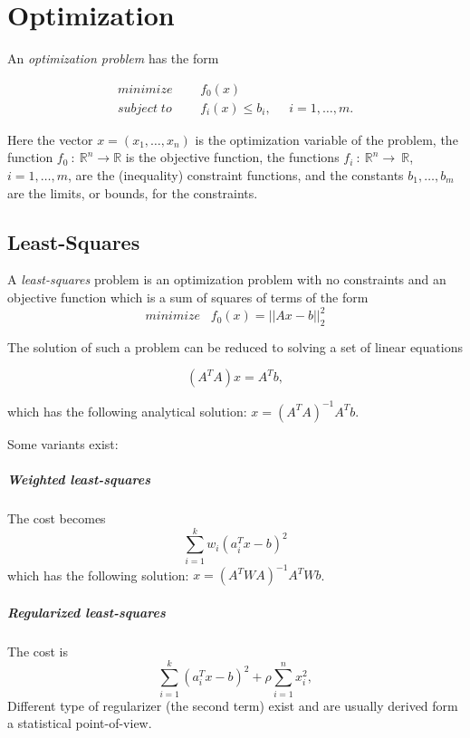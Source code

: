 
\chapter{Optimization}

An \textit{optimization problem} has the form

\begin{equation}
    \begin{split}
        minimize &\;\;\;\;\; f_0(x) \\
        subject\;to &\;\;\;\;\; f_i(x) \leq b_i,\;\;\;\;\; i=1, \dots, m.
    \end{split}
\end{equation}


Here the vector $x=(x_1, \dots, x_n)$ is the optimization variable of the problem, the function $f_0~:~\mathbb{R}^n\rightarrow \mathbb{R}$ is the objective function, the functions $f_i~ :~\mathbb{R}^n\rightarrow~\mathbb{R}$, $i=1, \dots, m$, are the (inequality) constraint functions, and the constants $b_1, \dots, b_m$ are the limits, or bounds, for the constraints.

\section{Least-Squares}

A \textit{least-squares} problem is an optimization problem with no constraints and an objective function which is a sum of squares of terms of the form
\begin{equation}
    minimize \;\;\; f_0(x) = ||Ax-b||^2_2
\end{equation}

The solution of such a problem can be reduced to solving a set of linear equations

\begin{equation}
    (A^T A)x=A^Tb,
\end{equation}

which has the following analytical solution: $x = (A^TA)^{-1}A^Tb$.

Some variants exist:
\paragraph{Weighted least-squares} The cost becomes
\begin{equation}
    \sum_{i=1}^{k} w_i(a_i^Tx-b)^2
\end{equation}
which has the following solution: $x=(A^TWA)^{-1}A^TWb$.

\paragraph{Regularized least-squares} The cost is
\begin{equation}
    \sum_ {i=1}^k (a_i^Tx-b)^2 + \rho \sum_{i=1}^n x_i^2,
\end{equation}
Different type of regularizer (the second term) exist and are usually derived form a statistical point-of-view.

